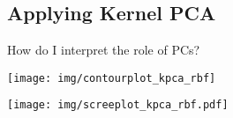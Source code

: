 

\subsection{Applying Kernel PCA}

\begin{frame}{How do I interpret the role of PCs?}


\svspace{-7mm}

\begin{center}
	\texttt{[image: img/contourplot\_kpca\_rbf]}
\end{center}
\svspace{-0.8cm}
\begin{center}
	\texttt{[image: img/screeplot\_kpca\_rbf.pdf]}
\end{center}

\end{frame}

